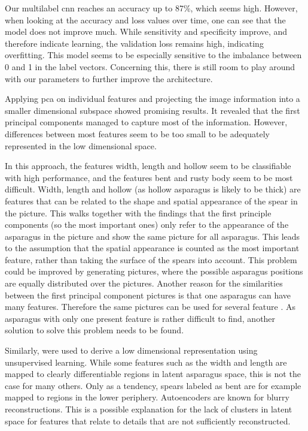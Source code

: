 Our multilabel  \acrshort{cnn} reaches an accuracy up to 87\%, which seems high. However, when looking at the accuracy and loss values over time, one can see that the model does not improve much. While sensitivity and specificity improve, and therefore indicate learning, the validation loss remains high, indicating overfitting. This model seems to be especially sensitive to the imbalance between 0 and 1 in the label vectors. Concerning this, there is still room to play around with our parameters to further improve the architecture.

\bigskip
Applying \acrshort{pca} on individual features and projecting the image information into a smaller dimensional subspace showed promising results. It revealed that the first principal components managed to capture most of the information. However, differences between most features seem to be too small to be adequately represented in the low dimensional space.

In this approach, the features width, length and hollow seem to be classifiable with high performance, and the features bent and rusty body seem to be most difficult. Width, length and hollow (as hollow asparagus is likely to be thick) are features that can be related to the shape and spatial appearance of the spear in the picture. This walks together with the findings that the first principle components (so the most important ones) only refer to the appearance of the asparagus in the picture and show the same picture for all asparagus. This leads to the assumption that the spatial appearance is counted as the most important feature, rather than taking the surface of the spears into account. This problem could be improved by generating pictures, where the possible asparagus positions are equally distributed over the pictures. Another reason for the similarities between the first principal component pictures is that one asparagus can have many features. Therefore the same pictures can be used for several feature . As asparagus with only one present feature is rather difficult to find, another solution to solve this problem needs to be found.

\bigskip
Similarly,  were used to derive a low dimensional representation using unsupervised learning. While some features such as the width and length are mapped to clearly differentiable regions in latent asparagus space, this is not the case for many others. Only as a tendency, spears labeled as bent are for example mapped to regions in the lower periphery. Autoencoders are known for blurry reconstructions. This is a possible explanation for the lack of clusters in latent space for features that relate to details that are not sufficiently reconstructed.

